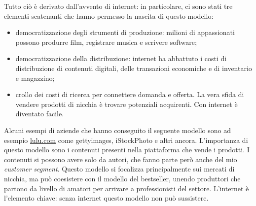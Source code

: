 Tutto ciò è derivato dall'avvento di internet: in particolare, ci sono stati
tre elementi scatenanti che hanno permesso la nascita di questo modello:
\begin{itemize}
 \item democratizzazione degli strumenti di produzione: milioni di appassionati
possono produrre film, registrare musica e scrivere software;
 \item democratizzazione della distribuzione: internet ha abbattuto i costi di
distribuzione di contenuti digitali, delle transazioni economiche e di
inventario e magazzino;
 \item crollo dei costi di ricerca per connettere domanda e offerta. La vera
sfida di vendere prodotti di nicchia è trovare potenziali acquirenti. Con
internet è diventato facile.
\end{itemize}

Alcuni esempi di aziende che hanno conseguito il seguente modello sono ad
esempio \url{lulu.com} come gettyimages, iStockPhoto e altri ancora.
L'importanza di questo modello sono i contenuti presenti nella piattaforma che
vende i prodotti. I contenuti si possono avere solo da autori, che fanno parte
però anche del mio \textit{customer segment}. Questo modello si focalizza
principalmente sui mercati di nicchia, ma può coesistere con il modello del
bestseller, unendo produttori che partono da livello di amatori per arrivare a
professionisti del settore. L'internet è l'elemento chiave: senza internet
questo modello non può sussistere.

